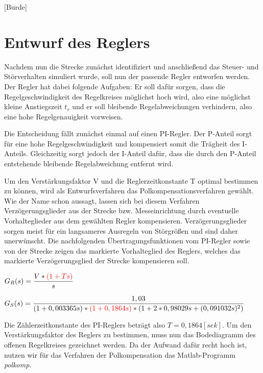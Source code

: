 
\newpage

[Burde]

\section{Entwurf des Reglers}

Nachdem nun die Strecke zunächst identifiziert und anschließend das Steuer- und Störverhalten simuliert wurde, soll nun der passende Regler entworfen werden. Der Regler hat dabei folgende Aufgaben: Er soll dafür sorgen, dass die Regelgeschwindigkeit des Regelkreises möglichst hoch wird, also eine möglichst kleine Anstiegszeit $t_{r}$ und er soll bleibende Regelabweichungen verhindern, also eine hohe Regelgenauigkeit vorweisen.

Die Entscheidung fällt zunächst einmal auf einen PI-Regler. Der P-Anteil sorgt für eine hohe Regelgeschwindigkeit und kompensiert somit die Trägheit des I-Anteils. Gleichzeitig sorgt jedoch der I-Anteil dafür, dass die durch den P-Anteil entstehende bleibende Regelabweichung entfernt wird. 

Um den Verstärkungsfaktor V und die Reglerzeitkonstante T optimal bestimmen zu können, wird als Entwurfsverfahren das Polkompensationsverfahren gewählt. Wie der Name schon aussagt, lassen sich bei diesem Verfahren Verzögerungsglieder aus der Strecke bzw. Messeinrichtung durch eventuelle Vorhalteglieder aus dem gewählten Regler kompensieren. Verzögerungsglieder sorgen meist für ein langsameres Ausregeln von Störgrößen und sind daher unerwünscht. Die nachfolgenden Übertragungsfunktionen vom PI-Regler sowie von der Strecke zeigen das markierte Vorhalteglied des Reglers, welches das markierte Verzögerungsglied der Strecke kompensieren soll. 

\begin{center}
$ G_{R}(s) = \dfrac{V*\textcolor{red}{(1+Ts)}}{s} $
\end{center}

\begin{center}
$ G_{S}(s) = \dfrac{1,03}{(1 + 0,003365s) * \textcolor{red}{(1 + 0,1864s)} * (1 + 2*0,98029s + (0,091032s)^{2}) }$
\end{center}

Die Zählerzeitkonstante des PI-Reglers beträgt also $ T = 0,1864[sek] $. Um den Verstärkungsfaktor des Reglers zu bestimmen, muss nun das Bodediagramm des offenen Regelkreises gezeichnet werden. Da der Aufwand dafür recht hoch ist, nutzen wir für das Verfahren der Polkompensation das Matlab-Programm \textit{polkomp}. 

